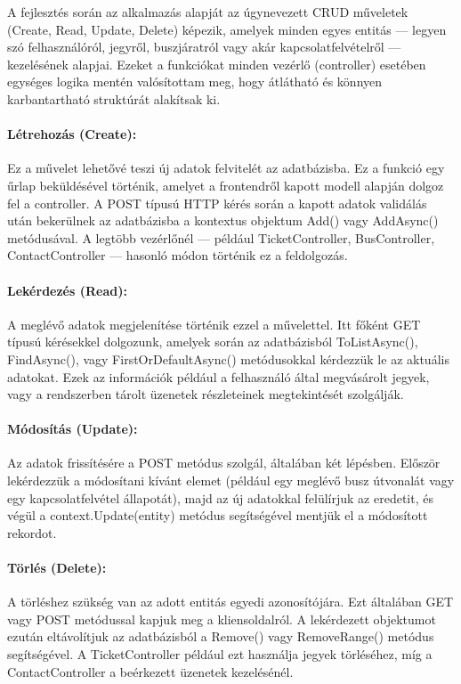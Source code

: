 A fejlesztés során az alkalmazás alapját az úgynevezett CRUD műveletek (Create, Read, Update, Delete) képezik, amelyek minden egyes entitás — legyen szó felhasználóról, jegyről, buszjáratról vagy akár kapcsolatfelvételről — kezelésének alapjai. Ezeket a funkciókat minden vezérlő (controller) esetében egységes logika mentén valósítottam meg, hogy átlátható és könnyen karbantartható struktúrát alakítsak ki.

\paragraph{Létrehozás (Create):}
Ez a művelet lehetővé teszi új adatok felvitelét az adatbázisba. Ez a funkció egy űrlap beküldésével történik, amelyet a frontendről kapott modell alapján dolgoz fel a controller. A POST típusú HTTP kérés során a kapott adatok validálás után bekerülnek az adatbázisba a kontextus objektum Add() vagy AddAsync() metódusával. A legtöbb vezérlőnél — például TicketController, BusController, ContactController — hasonló módon történik ez a feldolgozás.

\paragraph{Lekérdezés (Read):}
A meglévő adatok megjelenítése történik ezzel a művelettel. Itt főként GET típusú kérésekkel dolgozunk, amelyek során az adatbázisból ToListAsync(), FindAsync(), vagy FirstOrDefaultAsync() metódusokkal kérdezzük le az aktuális adatokat. Ezek az információk például a felhasználó által megvásárolt jegyek, vagy a rendszerben tárolt üzenetek részleteinek megtekintését szolgálják.

\paragraph{Módosítás (Update):}
Az adatok frissítésére a POST metódus szolgál, általában két lépésben. Először lekérdezzük a módosítani kívánt elemet (például egy meglévő busz útvonalát vagy egy kapcsolatfelvétel állapotát), majd az új adatokkal felülírjuk az eredetit, és végül a context.Update(entity) metódus segítségével mentjük el a módosított rekordot.

\paragraph{Törlés (Delete):}
A törléshez szükség van az adott entitás egyedi azonosítójára. Ezt általában GET vagy POST metódussal kapjuk meg a kliensoldalról. A lekérdezett objektumot ezután eltávolítjuk az adatbázisból a Remove() vagy RemoveRange() metódus segítségével. A TicketController például ezt használja jegyek törléséhez, míg a ContactController a beérkezett üzenetek kezelésénél.


